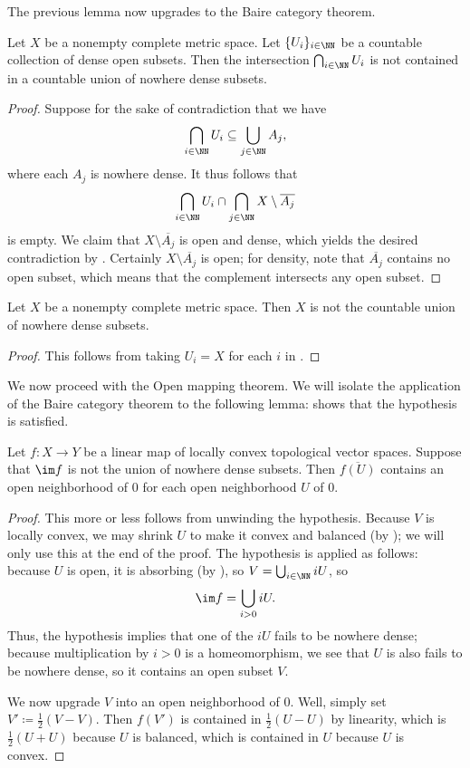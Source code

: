 \documentclass[notes.tex]{subfiles}
\begin{document}
The previous lemma now upgrades to the Baire category theorem.
\begin{theorem} \label{thm:baire-cat}
	Let $X$ be a nonempty complete metric space. Let $\{U_i\}_{i\in\NN}$ be a countable collection of dense open subsets. Then the intersection $\bigcap_{i\in\NN}U_i$ is not contained in a countable union of nowhere dense subsets.
\end{theorem}
\begin{proof}
	Suppose for the sake of contradiction that we have
	\[\bigcap_{i\in\NN}U_i\subseteq\bigcup_{j\in\NN}A_j,\]
	where each $A_j$ is nowhere dense. It thus follows that
	\[\bigcap_{i\in\NN}U_i\cap\bigcap_{j\in\NN}X\setminus\overline{A_j}\]
	is empty. We claim that $X\setminus\overline{A_j}$ is open and dense, which yields the desired contradiction by . Certainly $X\setminus\overline{A_j}$ is open; for density, note that $\overline{A_j}$ contains no open subset, which means that the complement intersects any open subset.
\end{proof}
\begin{corollary} \label{cor:baire-cat-whole-space}
	Let $X$ be a nonempty complete metric space. Then $X$ is not the countable union of nowhere dense subsets.
\end{corollary}
\begin{proof}
	This follows from taking $U_i=X$ for each $i$ in .
\end{proof}
We now proceed with the Open mapping theorem. We will isolate the application of the Baire category theorem to the following lemma:  shows that the hypothesis is satisfied.
\begin{lemma} \label{lem:omt-use-baire}
	Let $f\colon X\to Y$ be a linear map of locally convex topological vector spaces. Suppose that $\im f$ is not the union of nowhere dense subsets. Then $\overline{f(U)}$ contains an open neighborhood of $0$ for each open neighborhood $U$ of $0$.
\end{lemma}
\begin{proof}
	This more or less follows from unwinding the hypothesis. Because $V$ is locally convex, we may shrink $U$ to make it convex and balanced (by ); we will only use this at the end of the proof. The hypothesis is applied as follows: because $U$ is open, it is absorbing (by ), so $V=\bigcup_{i\in\NN}iU$, so
	\[\im f=\bigcup_{i>0}iU.\]
	Thus, the hypothesis implies that one of the $iU$ fails to be nowhere dense; because multiplication by $i>0$ is a homeomorphism, we see that $U$ is also fails to be nowhere dense, so it contains an open subset $V$.

	We now upgrade $V$ into an open neighborhood of $0$. Well, simply set $V'\coloneqq\frac12(V-V)$. Then $f(V')$ is contained in $\frac12(U-U)$ by linearity, which is $\frac12(U+U)$ because $U$ is balanced, which is contained in $U$ because $U$ is convex.
\end{proof}
\end{document}
